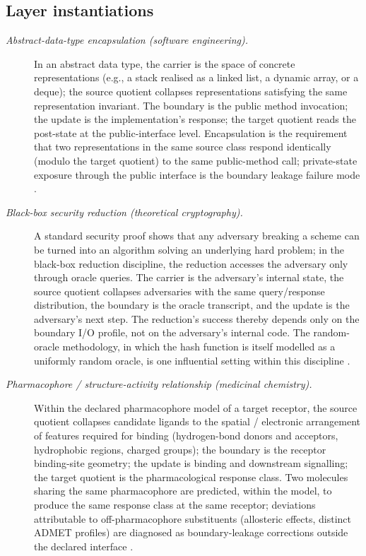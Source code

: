 \documentclass[11pt]{article}
\theoremstyle{definition}
\begin{document}
\subsection*{Layer instantiations}\label{layer-inst:F22}

\begin{description}
\item[\emph{Abstract-data-type encapsulation (software
engineering).}]
In an abstract data type, the carrier is the space of
concrete representations (e.g., a stack realised as a
linked list, a dynamic array, or a deque); the source
quotient collapses representations satisfying the same
representation invariant.  The boundary is the public
method invocation; the update is the implementation's
response; the target quotient reads the post-state at
the public-interface level.  Encapsulation is the
requirement that two representations in the same source
class respond identically (modulo the target quotient)
to the same public-method call; private-state exposure
through the public interface is the boundary leakage
failure mode \citep{LiskovZilles1974ADT}.

\item[\emph{Black-box security reduction
(theoretical cryptography).}]
A standard security proof shows that any adversary
breaking a scheme can be turned into an algorithm
solving an underlying hard problem; in the black-box
reduction discipline, the reduction accesses the
adversary only through oracle queries.  The carrier is
the adversary's internal state, the source quotient
collapses adversaries with the same query/response
distribution, the boundary is the oracle transcript,
and the update is the adversary's next step.  The
reduction's success thereby depends only on the
boundary I/O profile, not on the adversary's internal
code.  The random-oracle methodology, in which the hash
function is itself modelled as a uniformly random
oracle, is one influential setting within this
discipline \citep{BellareRogaway1993RandomOracles}.

\item[\emph{Pharmacophore / structure-activity relationship
(medicinal chemistry).}]
Within the declared pharmacophore model of a target
receptor, the source quotient collapses candidate ligands
to the spatial / electronic arrangement of features
required for binding (hydrogen-bond donors and acceptors,
hydrophobic regions, charged groups); the boundary is the
receptor binding-site geometry; the update is binding
and downstream signalling; the target quotient is the
pharmacological response class.  Two molecules sharing
the same pharmacophore are predicted, within the model,
to produce the same response class at the same receptor;
deviations attributable to off-pharmacophore substituents
(allosteric effects, distinct ADMET profiles) are
diagnosed as boundary-leakage corrections outside the
declared interface \citep{Wermuth1998IUPACGlossary}.


\end{description}
\end{document}

